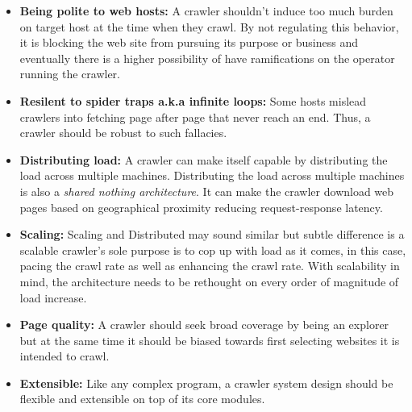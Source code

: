 \begin{itemize}
\item \textbf{Being polite to web hosts:} A crawler shouldn't induce too much burden on target host
  at the time when they crawl. By not regulating this behavior, it is blocking the web site from pursuing
  its purpose or business and eventually there is a higher possibility of have ramifications on the
  operator running the crawler.
\item \textbf{Resilent to spider traps a.k.a infinite loops:} Some hosts mislead crawlers into fetching page after page that
  never reach an end. Thus, a crawler should be robust to such fallacies.
\item \textbf{Distributing load:} A crawler can make itself capable by distributing the load across
  multiple machines. Distributing the load across multiple machines is also a \textit{shared nothing
    architecture}. It can make the crawler download web pages based on geographical proximity reducing
  request-response latency.
\item \textbf{Scaling:} Scaling and Distributed may sound similar but subtle difference is a scalable
  crawler's sole purpose is to cop up with load as it comes, in this case, pacing the crawl rate as well
  as enhancing the crawl rate. With scalability in mind, the architecture needs to be rethought on every
  order of magnitude of load increase.
\item \textbf{Page quality:} A crawler should seek broad coverage by being an explorer but at the same
  time it should be biased towards first selecting websites it is intended to crawl.
\item \textbf{Extensible:} Like any complex program, a crawler system design should be flexible and
  extensible on top of its core modules.
\end{itemize}

\pagebreak
